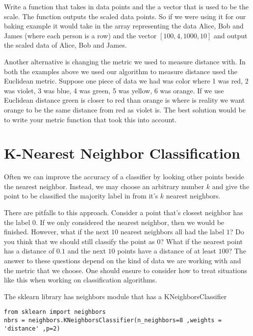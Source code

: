 \begin{problem}

Write a function that takes in data points and the a vector that is used to be the scale. The function outputs the scaled data points. So if we were using it for our baking example it would take in the array representing the data Alice, Bob and James (where each person is a row) and the vector $[100,4,1000,10]$ and output the scaled data of Alice, Bob and James.

\end{problem}

Another alternative is changing the metric we used to measure distance with. In both the examples above we used our algorithm to measure distance used the Euclidean metric. Suppose one piece of data we had was color where 1 was red, 2 was violet, 3 was blue, 4 was green, 5 was yellow, 6 was orange. If we use Euclidean distance green is closer to red than orange is where is reality we want orange to be the same distance from red as violet is. The best solution would be to write your metric function that took this into account. 


\section*{K-Nearest Neighbor Classification}

Often we can improve the accuracy of a classifier by looking other points beside the nearest neighbor.  Instead, we may choose an arbitrary number $k$ and give the point to be classified the majority label in from it's $k$ nearest neighbors. 

There are pitfalls to this approach.  Consider a point that's closest neighbor has the label $0$.  If we only considered the nearest neighbor, then we would be finished.  However, what if the next $10$ nearest neighbors all had the label $1$?  Do you think that we should still classify the point as $0$?  What if the nearest point has a distance of $0.1$ and the next $10$ points have a distance of at least $100$?  The answer to these questions depend on the kind of data we are working with and the metric that we choose.  One should ensure to consider how to treat situations like this when working on classification algorithms.


The sklearn library has neighbors module that has a KNeighborsClassifier
\begin{lstlisting}
from sklearn import neighbors
nbrs = neighbors.KNeighborsClassifier(n_neighbors=8 ,weights = 'distance' ,p=2)
\end{lstlisting}

